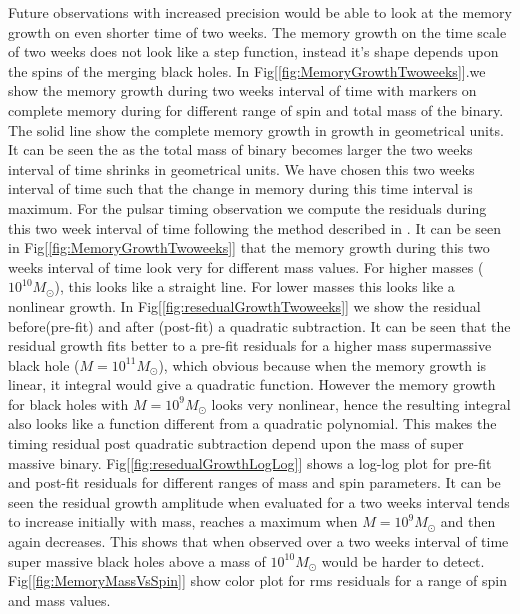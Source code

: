 \documentclass[twocolumn,showpacs,aps,prd,nobibnotes,floatfix]{revtex4-1}
\begin{document}
Future observations with increased precision would be able to look at the memory growth on even shorter time of two weeks. The memory growth on the time scale of two weeks does not look like a step function, instead it's shape depends upon the spins of the merging black holes. In Fig[\ref{fig:MemoryGrowthTwoweeks}].we show the memory growth during two weeks interval of time with markers on complete memory during for different range of spin and total mass of the binary. The solid line show the complete memory growth in growth in geometrical units. It can be seen the as the total mass of binary becomes larger the two weeks interval of time shrinks in geometrical units. We have chosen this two weeks interval of time such that the change in memory during this time interval is maximum. For the pulsar timing observation we compute the residuals during this two week interval of time following the method described in \cite{Pshirkov2010}. It can be seen in Fig[\ref{fig:MemoryGrowthTwoweeks}] that the memory growth during this two weeks interval of time look very for different mass values. For higher masses ($10^{10}M_{\odot}$), this looks like a straight line. For lower masses this looks like a nonlinear growth. In Fig[\ref{fig:resedualGrowthTwoweeks}] we show the residual before(pre-fit) and after  (post-fit) a quadratic subtraction. It can be seen that the residual growth fits better to a pre-fit residuals for a higher mass supermassive black hole ($M=10^{11}M_{\odot}$), which obvious because when the memory growth is linear, it integral would give a quadratic function. However the memory growth for black holes with $M = 10^{9}M_{\odot}$ looks very  nonlinear, hence the resulting integral also looks like a function different from a quadratic polynomial. This makes the timing residual post quadratic subtraction depend upon the mass of super massive binary. Fig[\ref*{fig:resedualGrowthLogLog}] shows a log-log plot for pre-fit and post-fit residuals for different ranges of mass and spin parameters. It can be seen the residual growth amplitude when evaluated for a two weeks interval tends to increase initially with mass, reaches a maximum when $M=10^{9}M_{\odot}$ and then again decreases. This shows that when observed over a two weeks interval of time super massive black holes above a mass of $10^{10}M_{\odot}$ would be harder to detect. Fig[\ref*{fig:MemoryMassVsSpin}] show color plot for rms residuals for a range of spin and mass values.  
\end{document}
